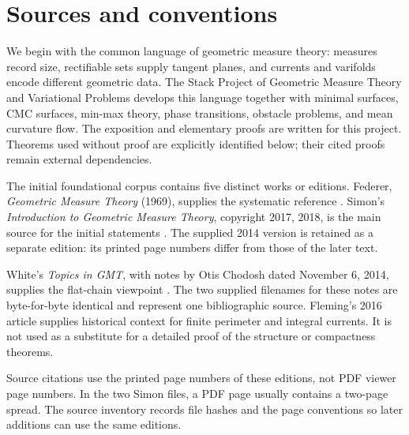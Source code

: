 \chapter{Sources and conventions}\label{sec:sources-conventions}
We begin with the common language of geometric measure theory: measures record size, rectifiable sets supply tangent planes, and currents and varifolds encode different geometric data. The Stack Project of Geometric Measure Theory and Variational Problems develops this language together with minimal surfaces, CMC surfaces, min-max theory, phase transitions, obstacle problems, and mean curvature flow. The exposition and elementary proofs are written for this project. Theorems used without proof are explicitly identified below; their cited proofs remain external dependencies.

\begin{remark}\label{rem:source-editions}
The initial foundational corpus contains five distinct works or editions. Federer, \emph{Geometric Measure Theory} (1969), supplies the systematic reference \cite{Fed69}. Simon's \emph{Introduction to Geometric Measure Theory}, copyright 2017, 2018, is the main source for the initial statements \cite{Sim18}. The supplied 2014 version \cite{Sim14} is retained as a separate edition: its printed page numbers differ from those of the later text.

White's \emph{Topics in GMT}, with notes by Otis Chodosh dated November 6, 2014, supplies the flat-chain viewpoint \cite{WhiCho14}. The two supplied filenames for these notes are byte-for-byte identical and represent one bibliographic source. Fleming's 2016 article \cite{Fle16} supplies historical context for finite perimeter and integral currents. It is not used as a substitute for a detailed proof of the structure or compactness theorems.

Source citations use the printed page numbers of these editions, not PDF viewer page numbers. In the two Simon files, a PDF page usually contains a two-page spread. The source inventory records file hashes and the page conventions so later additions can use the same editions.
\end{remark}

